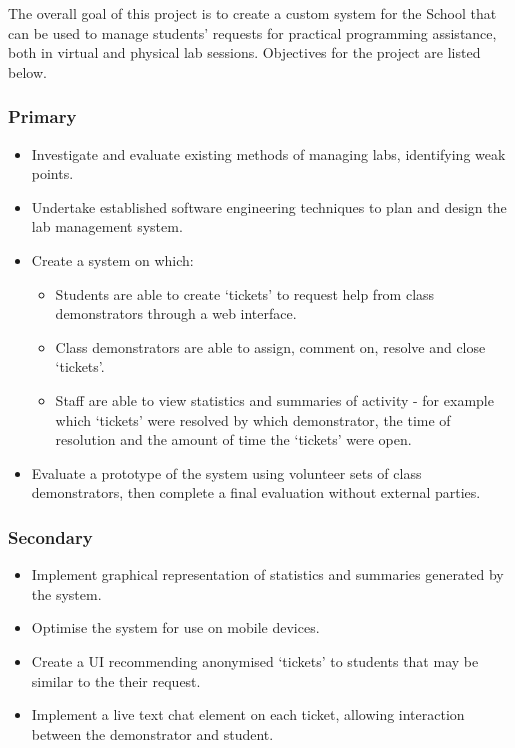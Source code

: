 \documentclass[a4paper,11pt]{article}
\begin{document}
The overall goal of this project is to create a custom system for the School that can be used to manage students' requests for practical programming assistance, both in virtual and physical lab sessions. Objectives for the project are listed below.

\subsubsection{Primary}
\begin{itemize}
    \item Investigate and evaluate existing methods of managing labs, identifying weak points.
    \item Undertake established software engineering techniques to plan and design the lab management system.
    \item Create a system on which:
    \begin{itemize}
        \item Students are able to create `tickets' to request help from class demonstrators through a web interface.
        \item Class demonstrators are able to assign, comment on, resolve and close `tickets'.
        \item Staff are able to view statistics and summaries of activity - for example which `tickets' were resolved by which demonstrator, the time of resolution and the amount of time the `tickets' were open.
    \end{itemize}
    \item Evaluate a prototype of the system using volunteer sets of class demonstrators, then complete a final evaluation without external parties. 
    
\end{itemize}

\subsubsection{Secondary}
\begin{itemize}
    \item Implement graphical representation of statistics and summaries generated by the system.
    \item Optimise the system for use on mobile devices. 
    \item Create a UI recommending anonymised `tickets' to students that may be similar to the their request.
    \item Implement a live text chat element on each ticket, allowing interaction between the demonstrator and student.
\end{itemize}
\end{document}
